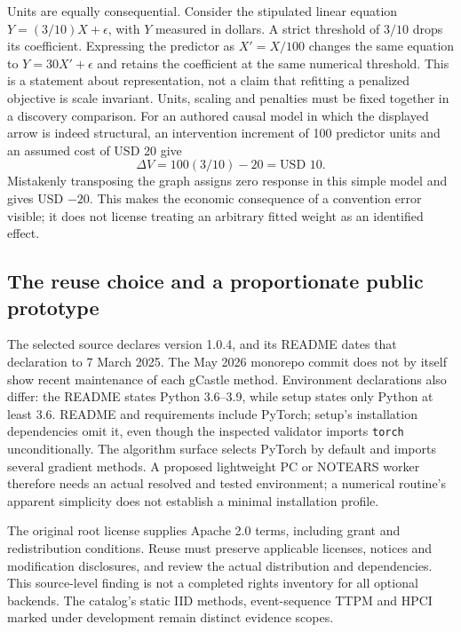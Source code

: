 Units are equally consequential. Consider the stipulated linear equation
$Y=(3/10)X+\epsilon$, with $Y$ measured in dollars. A strict threshold of $3/10$
drops its coefficient. Expressing the predictor as $X'=X/100$ changes the same
equation to $Y=30X'+\epsilon$ and retains the coefficient at the same numerical
threshold. This is a statement about representation, not a claim that refitting
a penalized objective is scale invariant. Units, scaling and penalties must be
fixed together in a discovery comparison.
For an authored causal model in which the displayed arrow is indeed structural,
an intervention increment of 100 predictor units and an assumed cost of USD 20
give
\begin{equation}
 \Delta V=100(3/10)-20=\text{USD }10.
 \label{exec20:gcastle-value}
\end{equation}
Mistakenly transposing the graph assigns zero response in this simple model and
gives USD $-20$. This makes the economic consequence of a convention error
visible; it does not license treating an arbitrary fitted weight as an
identified effect. \citep{exec20_gcastle_reference}

\subsection{The reuse choice and a proportionate public prototype}
\label{exec20:gcastle-decision}

The selected source declares version 1.0.4, and its README dates that declaration
to 7 March 2025. The May 2026 monorepo commit does not by itself show recent
maintenance of each gCastle method. Environment declarations also differ:
the README states Python 3.6--3.9, while setup states only Python at least 3.6.
README and requirements include PyTorch; setup's installation dependencies omit
it, even though the inspected validator imports \texttt{torch} unconditionally.
The algorithm surface selects PyTorch by default and imports several gradient
methods. A proposed lightweight PC or NOTEARS worker therefore needs an actual
resolved and tested environment; a numerical routine's apparent simplicity
does not establish a minimal installation profile.
\citep{exec20_gcastle_source}

The original root license supplies Apache 2.0 terms, including grant and
redistribution conditions. Reuse must preserve applicable licenses, notices and
modification disclosures, and review the actual distribution and dependencies.
This source-level finding is not a completed rights inventory for all optional
backends. The catalog's static IID methods, event-sequence TTPM and HPCI marked
under development remain distinct evidence scopes.
\citep{exec20_gcastle_source}

